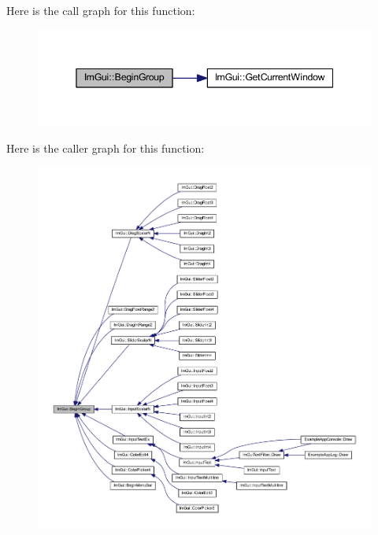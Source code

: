 Here is the call graph for this function\+:
\nopagebreak
\begin{figure}[H]
\begin{center}
\leavevmode
\includegraphics[width=345pt]{namespace_im_gui_a42407e196b7ed2a8755bff28aae9805f_cgraph}
\end{center}
\end{figure}
Here is the caller graph for this function\+:
\nopagebreak
\begin{figure}[H]
\begin{center}
\leavevmode
\includegraphics[width=350pt]{namespace_im_gui_a42407e196b7ed2a8755bff28aae9805f_icgraph}
\end{center}
\end{figure}
\mbox{\label{namespace_im_gui_a55cb9cfb9865204ac6fb21c965784f78}} 
